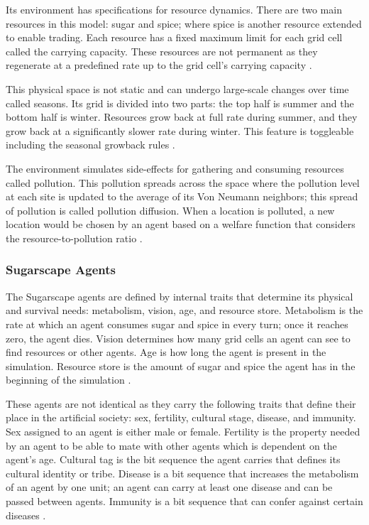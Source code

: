 \documentclass{icsthesis}
\begin{document}
\begin{mainmatter}
Its environment has specifications for resource dynamics. There are two main resources in this model: sugar and spice; where spice is another resource extended to enable trading. Each resource has a fixed maximum limit for each grid cell called the carrying capacity. These resources are not permanent as they regenerate at a predefined rate up to the grid cell’s carrying capacity \citep{Kehoe2015}. 

This physical space is not static and can undergo large-scale changes over time called seasons. Its grid is divided into two parts: the top half is summer and the bottom half is winter. Resources grow back at full rate during summer, and they grow back at a significantly slower rate during winter. This feature is toggleable including the seasonal growback rules \citep{Kehoe2015}. 

The environment simulates side-effects for gathering and consuming resources called pollution. This pollution spreads across the space where the pollution level at each site is updated to the average of its Von Neumann neighbors; this spread of pollution is called pollution diffusion. When a location is polluted, a new location would be chosen by an agent based on a welfare function that considers the resource-to-pollution ratio \citep{Kehoe2015}. 

				\subsubsection{Sugarscape Agents}
The Sugarscape agents are defined by internal traits that determine its physical and survival needs: metabolism, vision, age, and resource store. Metabolism is the rate at which an agent consumes sugar and spice in every turn; once it reaches zero, the agent dies. Vision determines how many grid cells an agent can see to find resources or other agents. Age is how long the agent is present in the simulation. Resource store is the amount of sugar and spice the agent has in the beginning of the simulation \citep{Kehoe2015}.

These agents are not identical as they carry the following traits that define their place in the artificial society: sex, fertility, cultural stage, disease, and immunity. Sex assigned to an agent is either male or female. Fertility is the property needed by an agent to be able to mate with other agents which is dependent on the agent’s age. Cultural tag is the bit sequence the agent carries that defines its cultural identity or tribe. Disease is a bit sequence that increases the metabolism of an agent by one unit; an agent can carry at least one disease and can be passed between agents. Immunity is a bit sequence that can confer against certain diseases \citep{Kehoe2015}.


\end{mainmatter}
\end{document}
